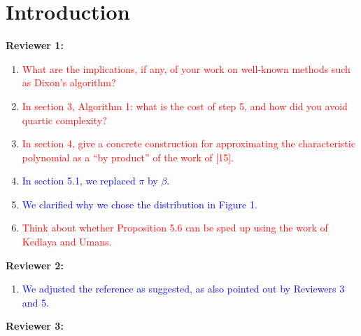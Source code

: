 \documentclass{sig-alternate-05-2015}
\newcommand{\done}[1]{\textcolor{blue}{#1}}
\newcommand{\tdo}[1]{\textcolor{red}{#1}}
\begin{document}
%
%

\section{Introduction}
\vspace{0.1in}
\noindent \textbf{Reviewer 1:}
\begin{enumerate}
\item \tdo{What are the implications, if any, of your work on well-known methods such as Dixon's algorithm?}
\item \tdo{In section 3, Algorithm 1: what is the cost of step 5, and how did you avoid quartic complexity?}
\item \tdo{In section 4, give a concrete construction for approximating the characteristic polynomial as a ``by product'' of the work of [15].}
\item \done{In section 5.1, we replaced $\pi$ by $\beta$.}
\item \done{We clarified why we chose the distribution in Figure 1.}
\item \tdo{Think about whether Proposition 5.6 can be sped up using the work of Kedlaya and Umans.}
\end{enumerate}
\textbf{Reviewer 2:}
\begin{enumerate}
\item \done{We adjusted the reference as suggested, as also pointed out by Reviewers 3 and 5.}
\end{enumerate}
\textbf{Reviewer 3:}
\end{document}
